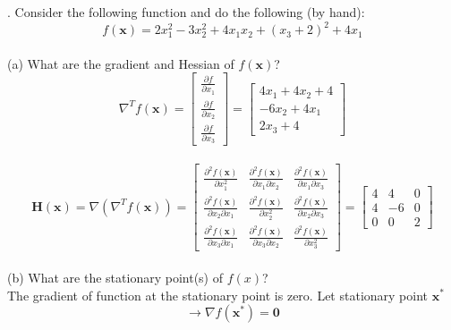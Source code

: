 \documentclass{article} %
\begin{document}
{
    . Consider the following function and do the following (by hand): \\
    \[ f(\mathbf{x}) = 2x_1^2 - 3x_2^2 + 4x_1x_2 + (x_3 + 2)^2 + 4x_1 \] \\

    (a) What are the gradient and Hessian of $ f(\mathbf{x}) $? \\

    \[ \nabla^T f(\mathbf{x}) = \begin{bmatrix} \frac{\partial f}{\partial x_1} \\
        \frac{\partial f}{\partial x_2} \\ \frac{\partial f}{\partial x_3} \end{bmatrix} 
        = \begin{bmatrix} 4x_1 + 4x_2 + 4 \\ -6x_2 + 4x_1 \\ 2x_3 + 4 \end{bmatrix} \] \\

    \[ \mathbf{H}(\mathbf{x}) = \nabla(\nabla^T f(\mathbf{x})) = \begin{bmatrix}
        \frac{\partial^2 f(\mathbf{x})}{\partial x_1^2} & \frac{\partial^2 f(\mathbf{x})}{\partial x_1 \partial x_2} & \frac{\partial^2 f(\mathbf{x})}{\partial x_1 \partial x_3} \\
        \frac{\partial^2 f(\mathbf{x})}{\partial x_2 \partial x_1} & \frac{\partial^2 f(\mathbf{x})}{\partial x_2^2} & \frac{\partial^2 f(\mathbf{x})}{\partial x_2 \partial x_3} \\
        \frac{\partial^2 f(\mathbf{x})}{\partial x_3 \partial x_1} & \frac{\partial^2 f(\mathbf{x})}{\partial x_3 \partial x_2} & \frac{\partial^2 f(\mathbf{x})}{\partial x_3^2}
    \end{bmatrix}
    = \begin{bmatrix}
        4 & 4 & 0 \\
        4 & -6 & 0 \\
        0 & 0 & 2
    \end{bmatrix} \] \\

    (b) What are the stationary point(s) of $ f(x) $? \\

    The gradient of function at the stationary point is zero.
    Let stationary point $\mathbf{x^*}$ \\
    \[ \rightarrow \nabla f(\mathbf{x^*}) = \mathbf{0} \] \\

}
\end{document}
